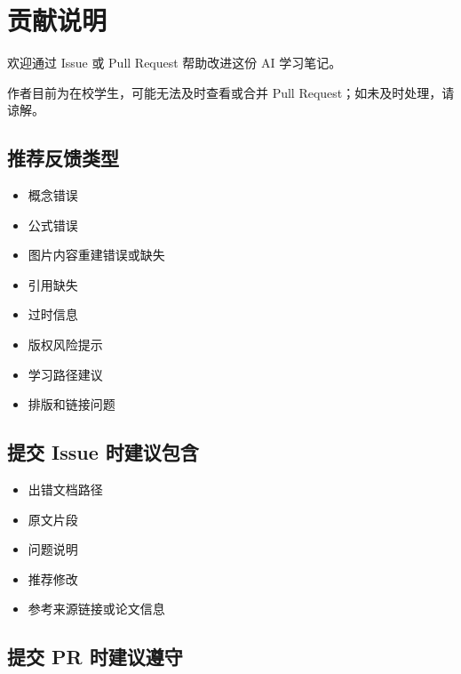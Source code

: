 \hypertarget{ux8d21ux732eux8bf4ux660e}{%
\chapter{贡献说明}\label{ux8d21ux732eux8bf4ux660e}}

欢迎通过 Issue 或 Pull Request 帮助改进这份 AI 学习笔记。

作者目前为在校学生，可能无法及时查看或合并 Pull Request；如未及时处理，请谅解。

\hypertarget{ux63a8ux8350ux53cdux9988ux7c7bux578b}{%
\section{推荐反馈类型}\label{ux63a8ux8350ux53cdux9988ux7c7bux578b}}

\begin{itemize}
\tightlist
\item
  概念错误
\item
  公式错误
\item
  图片内容重建错误或缺失
\item
  引用缺失
\item
  过时信息
\item
  版权风险提示
\item
  学习路径建议
\item
  排版和链接问题
\end{itemize}

\hypertarget{ux63d0ux4ea4-issue-ux65f6ux5efaux8baeux5305ux542b}{%
\section{提交 Issue 时建议包含}\label{ux63d0ux4ea4-issue-ux65f6ux5efaux8baeux5305ux542b}}

\begin{itemize}
\tightlist
\item
  出错文档路径
\item
  原文片段
\item
  问题说明
\item
  推荐修改
\item
  参考来源链接或论文信息
\end{itemize}

\hypertarget{ux63d0ux4ea4-pr-ux65f6ux5efaux8baeux9075ux5b88}{%
\section{提交 PR 时建议遵守}\label{ux63d0ux4ea4-pr-ux65f6ux5efaux8baeux9075ux5b88}}


